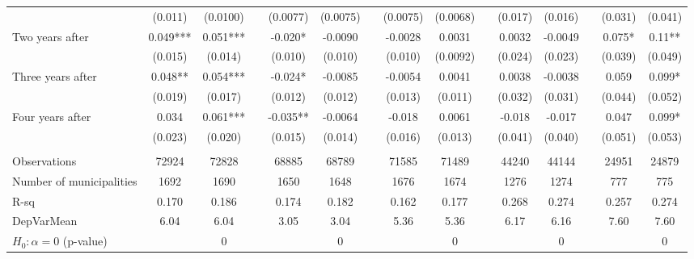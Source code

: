 \begin{tabular}{lcccccccccccccc}
      & (0.011) & (0.0100) &       & (0.0077) & (0.0075) &       & (0.0075) & (0.0068) &       & (0.017) & (0.016) &       & (0.031) & (0.041) \\
Two years after & 0.049*** & 0.051*** &       & -0.020* & -0.0090 &       & -0.0028 & 0.0031 &       & 0.0032 & -0.0049 &       & 0.075* & 0.11** \\
      & (0.015) & (0.014) &       & (0.010) & (0.010) &       & (0.010) & (0.0092) &       & (0.024) & (0.023) &       & (0.039) & (0.049) \\
Three years after & 0.048** & 0.054*** &       & -0.024* & -0.0085 &       & -0.0054 & 0.0041 &       & 0.0038 & -0.0038 &       & 0.059 & 0.099* \\
      & (0.019) & (0.017) &       & (0.012) & (0.012) &       & (0.013) & (0.011) &       & (0.032) & (0.031) &       & (0.044) & (0.052) \\
Four years after & 0.034 & 0.061*** &       & -0.035** & -0.0064 &       & -0.018 & 0.0061 &       & -0.018 & -0.017 &       & 0.047 & 0.099* \\
      & (0.023) & (0.020) &       & (0.015) & (0.014) &       & (0.016) & (0.013) &       & (0.041) & (0.040) &       & (0.051) & (0.053) \\
      &       &       &       &       &       &       &       &       &       &       &       &       &       &  \\
\midrule
Observations & 72924 & 72828 &       & 68885 & 68789 &       & 71585 & 71489 &       & 44240 & 44144 &       & 24951 & 24879 \\
Number of municipalities & 1692  & 1690  &       & 1650  & 1648  &       & 1676  & 1674  &       & 1276  & 1274  &       & 777   & 775 \\
R-sq  & 0.170 & 0.186 &       & 0.174 & 0.182 &       & 0.162 & 0.177 &       & 0.268 & 0.274 &       & 0.257 & 0.274 \\
DepVarMean & 6.04  & 6.04  &       & 3.05  & 3.04  &       & 5.36  & 5.36  &       & 6.17  & 6.16  &       & 7.60  & 7.60 \\
$H_0 : \alpha = 0$ (p-value) &       & 0     &       &       & 0     &       &       & 0     &       &       & 0     &       &       & 0 \\
\bottomrule
\bottomrule
\end{tabular}%
